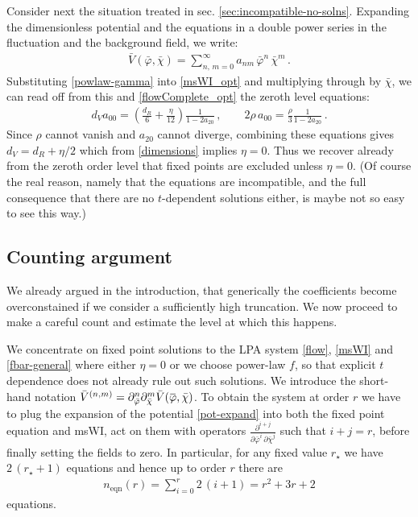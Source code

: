 \documentclass[11pt]{book}
\newcommand{\overbar}[1]{\mkern 1.5mu\overline{\mkern-1.5mu#1\mkern-1.5mu}\mkern 1.5mu}
\newcommand{\bp}{\overbar \varphi}
\newcommand{\bc}{\bar \chi}
\numberwithin{equation}{chapter}
\begin{document}
Consider next the situation treated in sec. \ref{sec:incompatible-no-solns}.
Expanding the dimensionless potential and the equations in a double power series in the fluctuation and
the background field, we write:
\begin{align}
  \label{pot-expand}
  \bar V(\bar\varphi,\bar\chi) = \sum_{n,\,m=0}^{\infty} a_{nm} \, \bar\varphi^n \, \bar\chi^m\,.
\end{align}
Substituting \eqref{powlaw-gamma} into \eqref{msWI_opt} and multiplying through by $\bc$,
we can read off from this and \eqref{flowComplete_opt} the zeroth level equations:
\begin{align}
  d_V a_{00} = \left(  \frac{d_R}{6} + \frac{\eta}{12} \right) \frac{1}{1 -  2a_{20}}\,,\qquad 2\rho\, a_{00} = \frac{\rho}{3} \frac{1}{1 -  2a_{20}}\,.
\end{align}
Since $\rho$ cannot vanish and $a_{20}$ cannot diverge,
combining these equations gives $d_V = d_R+\eta/2$ which from \eqref{dimensions} implies $\eta=0$.
Thus we recover already from the zeroth order level that fixed points are excluded unless $\eta=0$.
(Of course the real reason, namely that the equations are incompatible,
and the full consequence that there are no $t$-dependent solutions either,
is maybe not so easy to see this way.)


\subsection{Counting argument}\label{sec:counting}

We already argued in the introduction, that generically the coefficients become overconstained if we
consider a sufficiently high truncation. We now proceed to make a careful count and estimate the
level at which this happens.

We concentrate on fixed point solutions to the LPA system \eqref{flow},
\eqref{msWI} and \eqref{fbar-general} where either $\eta=0$ or we choose power-law $f$,
so that explicit $t$ dependence does not already rule out such solutions.
We introduce the short-hand notation
$\bar V ^{(n,m)}=\partial_{\bar \varphi}^n \partial_{\bar \chi}^m \bar V(\bp,\bc)$.
To obtain the system at order $r$ we have to plug the expansion of the potential \eqref{pot-expand}
into both the fixed point equation and msWI, act on them with operators
$\frac{\partial^{i+j}}{\partial \bar\varphi^i \, \partial \bar\chi^j}$ such that $i+j=r$,
before finally setting the fields to zero.
In particular, for any fixed value $r_{\star}$ we have $2 \, (r_{\star}+1)$ equations
and hence up to order $r$ there are
\begin{align}
  \label{number_eqns}
  n_{\text{eqn}}(r) = \sum_{i=0}^{r} 2\,(i+1) = r^2 + 3r + 2
\end{align}
equations.
\end{document}
